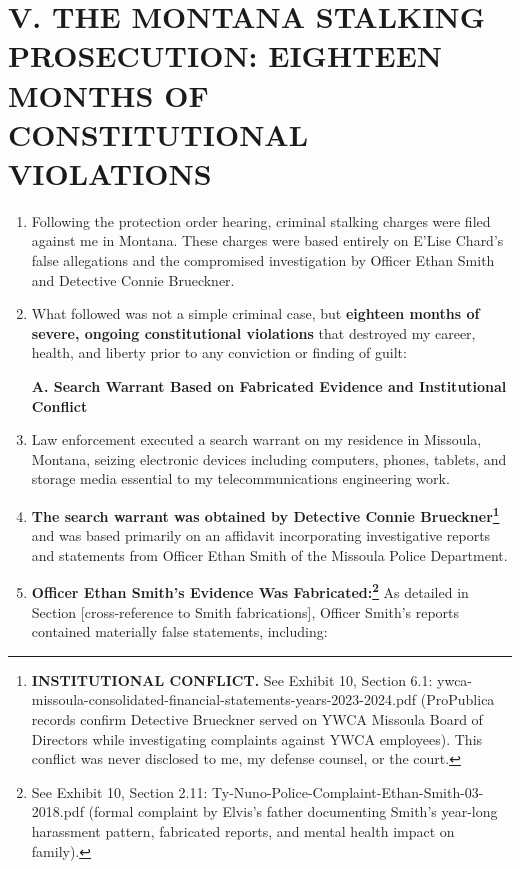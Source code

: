 \documentclass[12pt,letterpaper]{article}
\begin{document}
\section*{V. THE MONTANA STALKING PROSECUTION: EIGHTEEN MONTHS OF CONSTITUTIONAL VIOLATIONS}

\begin{enumerate}

\item Following the protection order hearing, criminal stalking charges were filed against me in Montana. These charges were based entirely on E'Lise Chard's false allegations and the compromised investigation by Officer Ethan Smith and Detective Connie Brueckner.

\item What followed was not a simple criminal case, but \textbf{eighteen months of severe, ongoing constitutional violations} that destroyed my career, health, and liberty prior to any conviction or finding of guilt:

\textbf{A. Search Warrant Based on Fabricated Evidence and Institutional Conflict}

\item Law enforcement executed a search warrant on my residence in Missoula, Montana, seizing electronic devices including computers, phones, tablets, and storage media essential to my telecommunications engineering work.

\item \textbf{The search warrant was obtained by Detective Connie Brueckner\footnote{\textbf{INSTITUTIONAL CONFLICT.} See Exhibit 10, Section 6.1: ywca-missoula-consolidated-financial-statements-years-2023-2024.pdf (ProPublica records confirm Detective Brueckner served on YWCA Missoula Board of Directors while investigating complaints against YWCA employees). This conflict was never disclosed to me, my defense counsel, or the court.}} and was based primarily on an affidavit incorporating investigative reports and statements from Officer Ethan Smith of the Missoula Police Department.

\item \textbf{Officer Ethan Smith's Evidence Was Fabricated:\footnote{See Exhibit 10, Section 2.11: Ty-Nuno-Police-Complaint-Ethan-Smith-03-2018.pdf (formal complaint by Elvis's father documenting Smith's year-long harassment pattern, fabricated reports, and mental health impact on family).}} As detailed in Section [cross-reference to Smith fabrications], Officer Smith's reports contained materially false statements, including:


\end{enumerate}
\end{document}
